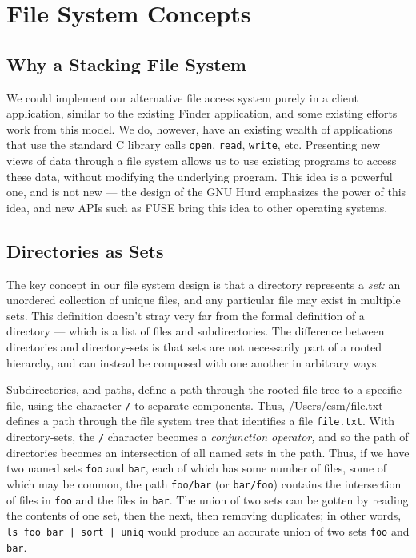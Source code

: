 \documentclass{article}
\begin{document}
\section{File System Concepts}

\subsection{Why a Stacking File System}

We could implement our alternative file access system purely in a
client application, similar to the existing Finder application, and
some existing efforts \cite{Gorter:2004,Nickell:2006} work from this
model. We do, however, have an existing wealth of applications that
use the standard C library calls \texttt{open}, \texttt{read},
\texttt{write}, etc. Presenting new views of data through a file
system allows us to use existing programs to access these data,
without modifying the underlying program. This idea is a powerful one,
and is not new --- the design of the GNU Hurd \cite{Bushnell:1994}
emphasizes the power of this idea, and new APIs such as FUSE
\cite{Szeredi:2006} bring this idea to other operating systems.

\subsection{Directories as Sets}

The key concept in our file system design is that a directory
represents a \emph{set:} an unordered collection of unique files, and
any particular file may exist in multiple sets. This definition
doesn't stray very far from the formal definition of a directory ---
which is a list of files and subdirectories. The difference between
directories and directory-sets is that sets are not necessarily part
of a rooted hierarchy, and can instead be composed with one another in
arbitrary ways.

Subdirectories, and paths, define a path through the rooted file tree
to a specific file, using the character \texttt{/} to separate
components. Thus, \url{/Users/csm/file.txt} defines a path through
the file system tree that identifies a file \texttt{file.txt}. With
directory-sets, the \texttt{/} character becomes a \emph{conjunction
  operator,} and so the path of directories becomes an intersection of
all named sets in the path. Thus, if we have two named sets
\texttt{foo} and \texttt{bar}, each of which has some number of files,
some of which may be common, the path \texttt{foo/bar} (or
\texttt{bar/foo}) contains the intersection of files in \texttt{foo}
and the files in \texttt{bar}. The union of two sets can be gotten by
reading the contents of one set, then the next, then removing
duplicates; in other words, \texttt{ls foo bar | sort | uniq} would
produce an accurate union of two sets \texttt{foo} and \texttt{bar}.
\end{document}
